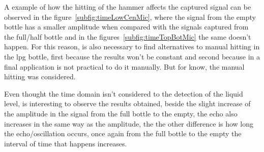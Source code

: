 A example of how the hitting of the hammer affects the captured signal can be observed in the figure~\ref{subfig:timeLowCenMic}, where the signal from the empty bottle has a smaller amplitude when compared with the signals captured from the full/half bottle and in the figures~\ref{subfig:timeTopBotMic} the same doesn't happen. For this reason, is also necessary to find alternatives to manual hitting in the \acrshort{lpg} bottle, first because the results won't be constant and second because in a final application is not practical to do it manually. But for know, the manual hitting was considered.

Even thought the time domain isn't considered to the detection of the liquid level, is interesting to observe the results obtained, beside the slight increase of the amplitude in the signal from the full bottle to the empty, the echo also increases in the same way as the amplitude, the the other difference is how long the echo/oscillation occurs, once again from the full bottle to the empty the interval of time that happens increases. 

